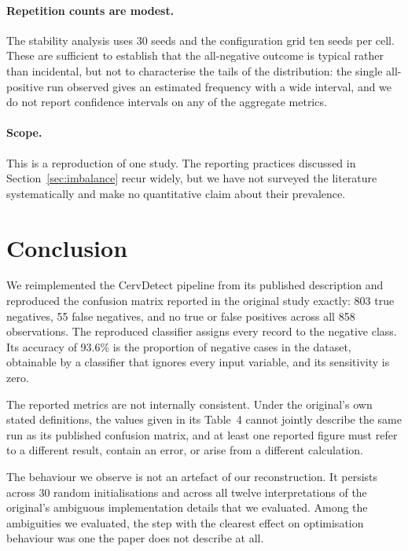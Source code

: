 \paragraph{Repetition counts are modest.} The stability analysis uses 30 seeds
and the configuration grid ten seeds per cell. These are sufficient to
establish that the all-negative outcome is typical rather than incidental, but
not to characterise the tails of the distribution: the single all-positive run
observed gives an estimated frequency with a wide interval, and we do not
report confidence intervals on any of the aggregate metrics.

\paragraph{Scope.} This is a reproduction of one study. The reporting practices
discussed in Section~\ref{sec:imbalance} recur widely, but we have not surveyed
the literature systematically and make no quantitative claim about their
prevalence.

\section{Conclusion}\label{sec:conclusion}

We reimplemented the CervDetect pipeline from its published description and
reproduced the confusion matrix reported in the original study exactly: 803
true negatives, 55 false negatives, and no true or false positives across all
858 observations. The reproduced classifier assigns every record to the
negative class. Its accuracy of 93.6\% is the proportion of negative cases in
the dataset, obtainable by a classifier that ignores every input variable, and
its sensitivity is zero.

The reported metrics are not internally consistent. Under the original's own
stated definitions, the values given in its Table~4 cannot jointly describe the
same run as its published confusion matrix, and at least one reported figure
must refer to a different result, contain an error, or arise from a different
calculation.

The behaviour we observe is not an artefact of our reconstruction. It persists
across 30 random initialisations and across all twelve interpretations of the
original's ambiguous implementation details that we evaluated. Among the
ambiguities we evaluated, the step with the clearest effect on optimisation
behaviour was one the paper does not describe at all.

